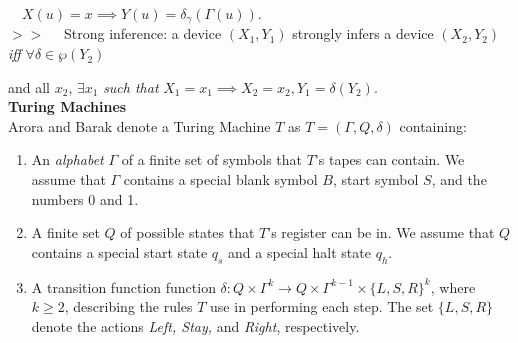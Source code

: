 \documentclass[11pt]{article}
\begin{document}
$ \quad X(u) = x \implies Y(u) = \delta_{\gamma}(\Gamma(u)) $.  \\
$ >> \quad $ Strong inference: a device $ (X_1, Y_1) $ strongly infers a device $ (X_2, Y_2) $ \textit{ iff } $\forall \delta \in \wp(Y_2) $ 

\quad and all $ x_2 $, $ \exists x_1 $ \textit{ such that } $ X_1 = x_1 \implies X_2 = x_2, Y_1 = \delta(Y_2) $. \\

\newpage
\textbf{Turing Machines} \\


 Arora and Barak denote a Turing Machine $ T $ as $ T = (\Gamma, Q, \delta) $ containing:
\begin{enumerate}
\item An \textit{alphabet} $ \Gamma $ of a finite set of symbols that $ T $'s tapes can contain. We assume that $ \Gamma $ contains a special blank symbol $ B $, start symbol $ S $, and the numbers 0 and 1. 
\item A finite set $ Q $ of possible states that $ T $'s register can be in. We assume that $ Q $ contains a special start state $ q_{s} $ and a special halt state $ q_{h} $. 
\item A transition function function $ \delta : Q \times \Gamma^{k} \rightarrow Q \times \Gamma^{k - 1} \times \{L, S, R\}^{k} $, where $ k \geq 2$, describing the rules $ T $ use in performing each step. The set $\{L ,S, R\}$ denote the actions \textit{Left, Stay,} and \textit{Right}, respectively. 
\end{enumerate}
\end{document}
